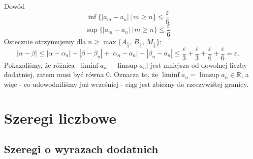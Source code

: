 \documentclass{article}
\newcommand{\R}{\mathbb{R}}
\newcommand{\eps}{\varepsilon}
\begin{document}
\begin{dow}{Dowód}
\begin{equation}
            \inf\{ |a_m - a_n| \, \big| \, m \geqslant n \} \leqslant \frac{\eps}{6}
        \end{equation} \begin{equation}
            \sup\{ |a_m - a_n| \, \big| \, m \geqslant n \} \leqslant \frac{\eps}{6}
        \end{equation}
        Ostecznie otrzymujemy dla $n \geqslant \max \{A_{\frac{\eps}{3}}, \, B_{\frac{\eps}{3}}, \, M_{\frac{\eps}{6}}\}$: \begin{equation}
            |\alpha - \beta| \leqslant |\alpha - \alpha_n| + |\beta - \beta_n| +  |\alpha_n - a_n| + |\beta_n - a_n| \leqslant \frac{\eps}{3} + \frac{\eps}{3} + \frac{\eps}{6} + \frac{\eps}{6} = \eps.
        \end{equation}
        Pokazaliśmy, że różnica $|\liminf a_n - \limsup a_n|$ jest mniejsza od dowolnej liczby dodatniej, zatem musi być równa $0$. Oznacza to, że $\liminf a_n = \limsup a_n \in \R$, a więc - co udowodniliśmy już wcześniej - ciąg jest zbieżny do rzeczywiśtej granicy.
    \end{dow}



\section{Szeregi liczbowe}
    \subsection{Szeregi o wyrazach dodatnich}
\end{document}
